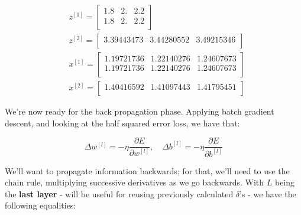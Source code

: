 \documentclass[12pt]{article}
\begin{document}
\begin{enumerate}[leftmargin=\labelsep]
        \begin{equation*}
          \begin{aligned}
             & z^{[1]} = \begin{bmatrix}
                           1.8 & 2. & 2.2 \\
                           1.8 & 2. & 2.2 \\
                         \end{bmatrix}                       \\ & z^{[2]} = \begin{bmatrix}
              3.39443473 & 3.44280552 & 3.49215346 \\
            \end{bmatrix}  \\
             & x^{[1]} = \begin{bmatrix}
                           1.19721736 & 1.22140276 & 1.24607673 \\
                           1.19721736 & 1.22140276 & 1.24607673 \\
                         \end{bmatrix} \\ & x^{[2]} = \begin{bmatrix}
              1.40416592 & 1.41097443 & 1.41795451 \\
            \end{bmatrix}
          \end{aligned}
        \end{equation*}

        We're now ready for the back propagation phase. Applying batch gradient descent,
        and looking at the half squared error loss, we have that:

        \begin{equation*}
          \Delta w^{[l]} = - \eta \frac{\partial E}{\partial w^{[l]}}, \quad
          \Delta b^{[l]} = - \eta \frac{\partial E}{\partial b^{[l]}}
        \end{equation*}

        We'll want to propagate information backwards; for that, we'll need to use
        the chain rule, multiplying successive derivatives as we go backwards.
        With $L$ being the \textbf{last layer} - will be useful for reusing previously
        calculated $\delta$'s - we have the following equalities:


\end{enumerate}
\end{document}
